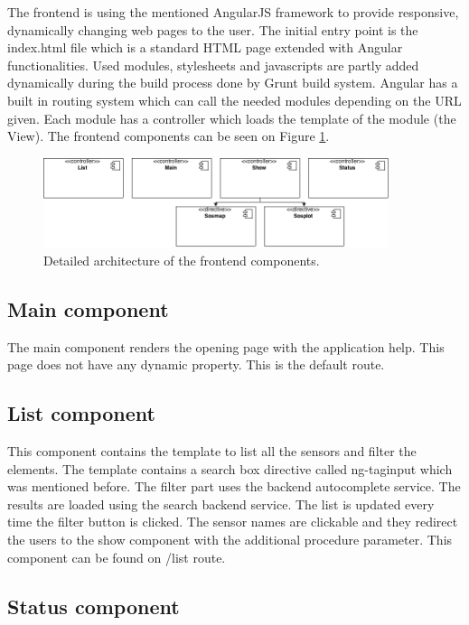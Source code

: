 The frontend is using the mentioned AngularJS framework to provide responsive, dynamically changing web pages to the user. The initial entry point is the index.html file which is a standard HTML page extended with Angular functionalities. Used modules, stylesheets and javascripts are partly added dynamically during the build process done by Grunt build system. 
Angular has a built in routing system which can call the needed modules depending on the URL given. Each module has a controller which loads the template of the module (the View). The frontend components can be seen on Figure \ref{fig:frontarch}.


\begin{figure}[h]
\centering
\includegraphics[width=0.9\textwidth]{figures/frontend.png}
\caption{Detailed architecture of the frontend components.\label{fig:frontarch}}
\end{figure}

\subsection{Main component}
The main component renders the opening page with the application help. This page does not have any dynamic property. This is the default route.

\subsection{List component}
This component contains the template to list all the sensors and filter the elements. The template contains a search box directive called ng-taginput which was mentioned before. The filter part uses the backend autocomplete service. The results are loaded using the search backend service. The list is updated every time the filter button is clicked.
The sensor names are clickable and they redirect the users to the show component with the additional procedure parameter. This component can be found on /list route.

\subsection{Status component}

